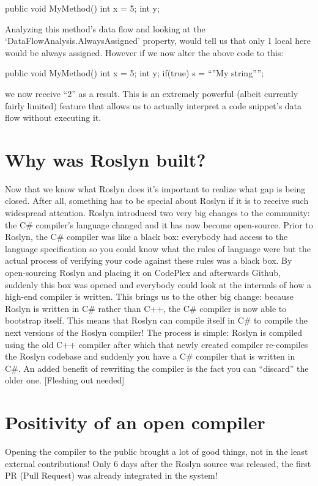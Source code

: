    public void MyMethod()
   {
      int x = 5;
      int y;
   }
	
Analyzing this method’s data flow and looking at the ‘DataFlowAnalysis.AlwaysAssigned’ property, would tell us that only 1 local here would be always assigned. However if we now alter the above code to this:

   public void MyMethod()
   {
      int x = 5;
      int y;
      if(true)
         s = “”My string””;
   }
	
we now receive “2” as a result. This is an extremely powerful (albeit currently fairly limited) feature that allows us to actually interpret a code snippet’s data flow without executing it.


\section{Why was Roslyn built?}
\label{sec:intro-why}

Now that we know what Roslyn does it’s important to realize what gap is being closed. After all, something has to be special about Roslyn if it is to receive such widespread attention.
Roslyn introduced two very big changes to the community: the C\# compiler’s language changed and it has now become open-source. Prior to Roslyn, the C\# compiler was like a black box: everybody had access to the language specification so you could know what the rules of language were but the actual process of verifying your code against these rules was a black box. By open-sourcing Roslyn and placing it on CodePlex and afterwards Github, suddenly this box was opened and everybody could look at the internals of how a high-end compiler is written.
This brings us to the other big change: because Roslyn is written in C\# rather than C++, the C\# compiler is now able to bootstrap itself. This means that Roslyn can compile itself in C\# to compile the next versions of the Roslyn compiler! The process is simple: Roslyn is compiled using the old C++ compiler after which that newly created compiler re-compiles the Roslyn codebase and suddenly you have a C\# compiler that is written in C\#. 
An added benefit of rewriting the compiler is the fact you can “discard” the older one. [Fleshing out needed]

\section{Positivity of an open compiler}
\label{sec:intro-pos-comp}

Opening the compiler to the public brought a lot of good things, not in the least external contributions! Only 6 days after the Roslyn source was released, the first PR (Pull Request) was already integrated in the system!

